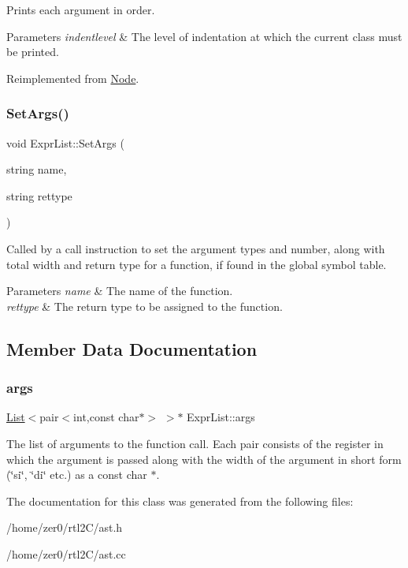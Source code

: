 Prints each argument in order. 
\begin{DoxyParams}{Parameters}
{\em indentlevel} & The level of indentation at which the current class must be printed. \\
\hline
\end{DoxyParams}


Reimplemented from \hyperlink{class_node_a3e67ec8d22182b721717af14fe0c3000}{Node}.

\mbox{\label{class_expr_list_a09056537b95e88b367a1cfa306ed2349}} 
\subsubsection{\texorpdfstring{Set\+Args()}{SetArgs()}}
{\footnotesize\ttfamily void Expr\+List\+::\+Set\+Args (\begin{DoxyParamCaption}\item[{string}]{name,  }\item[{string}]{rettype }\end{DoxyParamCaption})}

Called by a call instruction to set the argument types and number, along with total width and return type for a function, if found in the global symbol table. 
\begin{DoxyParams}{Parameters}
{\em name} & The name of the function. \\
\hline
{\em rettype} & The return type to be assigned to the function. \\
\hline
\end{DoxyParams}


\subsection{Member Data Documentation}
\mbox{\label{class_expr_list_a4f32b04d153d6d304265ecfdb16929c2}} 
\subsubsection{\texorpdfstring{args}{args}}
{\footnotesize\ttfamily \hyperlink{class_list}{List}$<$pair$<$int,const char$\ast$$>$ $>$$\ast$ Expr\+List\+::args\hspace{0.3cm}{\ttfamily [protected]}}

The list of arguments to the function call. Each pair consists of the register in which the argument is passed along with the width of the argument in short form (\char`\"{}si\char`\"{}, \char`\"{}di\char`\"{} etc.) as a const char $\ast$. 

The documentation for this class was generated from the following files\+:\begin{DoxyCompactItemize}
\item 
/home/zer0/rtl2\+C/ast.\+h\item 
/home/zer0/rtl2\+C/ast.\+cc\end{DoxyCompactItemize}
